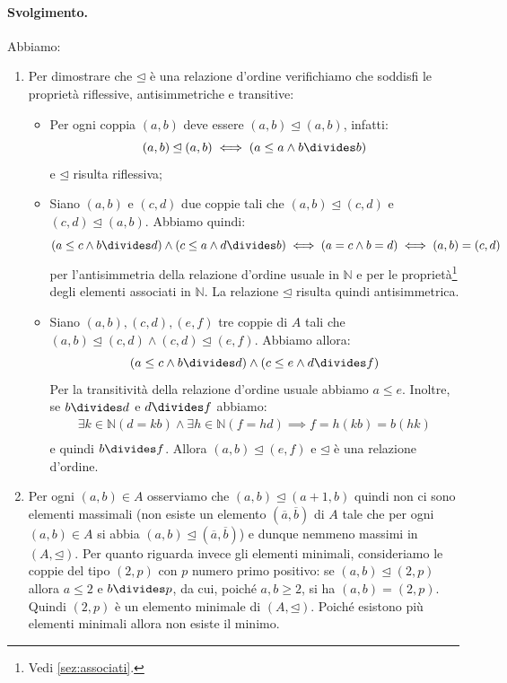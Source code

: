 \paragraph{Svolgimento.} Abbiamo:
\begin{enumerate}
	\item Per dimostrare che $\unlhd$ è una relazione d'ordine verifichiamo che soddisfi le proprietà riflessive, antisimmetriche e transitive:
	\begin{itemize}
		\item Per ogni coppia $(a,b)$ deve essere $(a,b) \unlhd (a,b)$, infatti:
		\begin{displaymath}
			(a,b) \unlhd (a,b) \iff (a \leq a \land b \divides b)
		\end{displaymath}
		e $\unlhd$ risulta riflessiva;
		\item Siano $(a,b)$ e $(c,d)$ due coppie tali che $(a,b) \unlhd (c,d)$ e $(c,d) \unlhd (a,b)$. Abbiamo quindi:
		\begin{displaymath}
			(a \leq c \land b \divides d) \land (c \leq a \land d \divides b) \iff (a=c \land b=d) \iff (a,b) = (c,d)
		\end{displaymath}
		per l'antisimmetria della relazione d'ordine usuale in $\mathbb{N}$ e per le proprietà\footnote{Vedi \ref{sez:associati}.} degli elementi associati in $\mathbb{N}$. La relazione $\unlhd$ risulta quindi antisimmetrica.
		\item Siano $(a,b),(c,d),(e,f)$ tre coppie di $A$ tali che $(a,b) \unlhd (c,d) \land (c,d) \unlhd (e,f)$. Abbiamo allora:
		\begin{displaymath}
			(a \leq c \land b \divides d) \land (c \leq e \land d \divides f)
		\end{displaymath}
		Per la transitività della relazione d'ordine usuale abbiamo $a \leq e$. Inoltre, se $b \divides d$ e $d \divides f$ abbiamo:
		\begin{align*}
			\exists k \in \mathbb{N} (d=kb) \land \exists h \in \mathbb{N}(f=hd) \implies f=h(kb)=b(hk) \\
		\end{align*}
		e quindi $b \divides f$. Allora $(a,b) \unlhd (e,f)$ e $\unlhd$ è una relazione d'ordine.
	\end{itemize}
	\item Per ogni $(a,b) \in A$ osserviamo che $(a,b) \unlhd (a+1,b)$ quindi non ci sono elementi massimali (non esiste un elemento $(\overline{a},\overline{b})$ di $A$ tale che per ogni $(a,b) \in A$ si abbia $(a,b) \unlhd (\overline{a},\overline{b})$) e dunque nemmeno massimi in $(A,\unlhd)$. Per quanto riguarda invece gli elementi minimali, consideriamo le coppie del tipo $(2,p)$ con $p$ numero primo positivo: se $(a,b) \unlhd (2,p)$ allora $a \leq 2$ e $b \divides p$, da cui, poiché $a,b \geq 2$, si ha $(a,b)=(2,p)$. Quindi $(2,p)$ è un elemento minimale di $(A,\unlhd)$. Poiché esistono più elementi minimali allora non esiste il minimo.

\end{enumerate}
